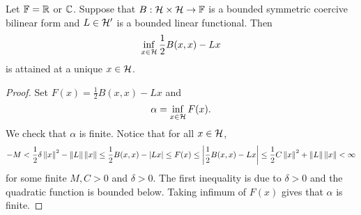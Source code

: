 \begin{theorem}\label{thm:lax_milgram_2}
    Let $\mathbb{F} = \mathbb{R}$ or $\mathbb{C}$. Suppose that $B:\mathcal{H}\times\mathcal{H}\to\mathbb{F}$ is 
    a bounded symmetric coercive bilinear form and $L\in\mathcal{H}'$ is a bounded 
    linear functional. Then 
    \begin{equation*}
        \inf_{x\in\mathcal{H}} \frac{1}{2}B(x,x) - Lx
    \end{equation*}
    is attained at a unique $x\in\mathcal{H}$.
\end{theorem}
\begin{proof}
    Set $F(x) = \frac{1}{2}B(x,x) - Lx$ and 
    \begin{equation*}
        \alpha = \inf_{x\in\mathcal{H}} F(x).
    \end{equation*}
    We check that $\alpha$ is finite. Notice that for all $x\in\mathcal{H}$,
    \begin{equation*}
        -M < \frac{1}{2}\delta\left\lVert {x} \right\rVert^2 - \left\lVert {L} \right\rVert\left\lVert {x} \right\rVert 
        \leq \frac{1}{2}B(x,x) - \left\lvert {Lx} \right\rvert \leq F(x) 
        \leq \left\lvert {\frac{1}{2}B(x,x)-Lx} \right\rvert \leq \frac{1}{2}C\left\lVert {x} \right\rVert^2 + \left\lVert {L} \right\rVert\left\lVert {x} \right\rVert < \infty
    \end{equation*}
    for some finite $M,C>0$ and $\delta>0$. The first inequality is due to 
    $\delta>0$ and the quadratic function is bounded below. Taking infimum 
    of $F(x)$ gives that $\alpha$ is finite. 


\end{proof}

